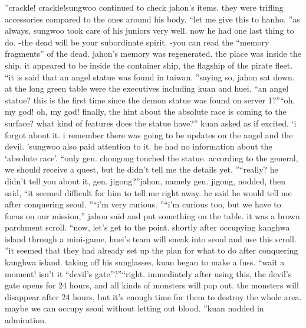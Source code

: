 ”crackle! crackle!sungwoo continued to check jahon’s items.
 they were trifling accessories compared to the ones around his body.
“let me give this to hanho.
”as always, sungwoo took care of his juniors very well.
now he had one last thing to do.
-the dead will be your subordinate spirit.
-you can read the “memory fragments” of the dead.
jahon’s memory was regenerated.
the place was inside the ship.
 it appeared to be inside the container ship, the flagship of the pirate fleet.
“it is said that an angel statue was found in taiwan.
”saying so, jahon sat down.
 at the long green table were the executives including kuan and huei.
“an angel statue? this is the first time since the demon statue was found on server 1?”“oh, my god! oh, my god! finally, the hint about the absolute race is coming to the surface? what kind of features does the statue have?” kuan asked as if excited.
‘i forgot about it.
 i remember there was going to be updates on the angel and the devil.
’sungwoo also paid attention to it.
 he had no information about the ‘absolute race’.
“only gen.
 chongong touched the statue.
 according to the general, we should receive a quest, but he didn’t tell me the details yet.
”“really? he didn’t tell you about it, gen.
 jigong?”jahon, namely gen.
 jigong, nodded, then said, “it seemed difficult for him to tell me right away.
 he said he would tell me after conquering seoul.
”“i’m very curious.
”“i’m curious too, but we have to focus on our mission,” jahon said and put something on the table.
 it was a brown parchment scroll.
“now, let’s get to the point.
 shortly after occupying kanghwa island through a mini-game, huei’s team will sneak into seoul and use this scroll.
”it seemed that they had already set up the plan for what to do after conquering kanghwa island.
 taking off his sunglasses, kuan began to make a fuss.
“wait a moment! isn’t it “devil’s gate”?”“right.
 immediately after using this, the devil’s gate opens for 24 hours, and all kinds of monsters will pop out.
 the monsters will disappear after 24 hours, but it’s enough time for them to destroy the whole area.
 maybe we can occupy seoul without letting out blood.
”kuan nodded in admiration.


